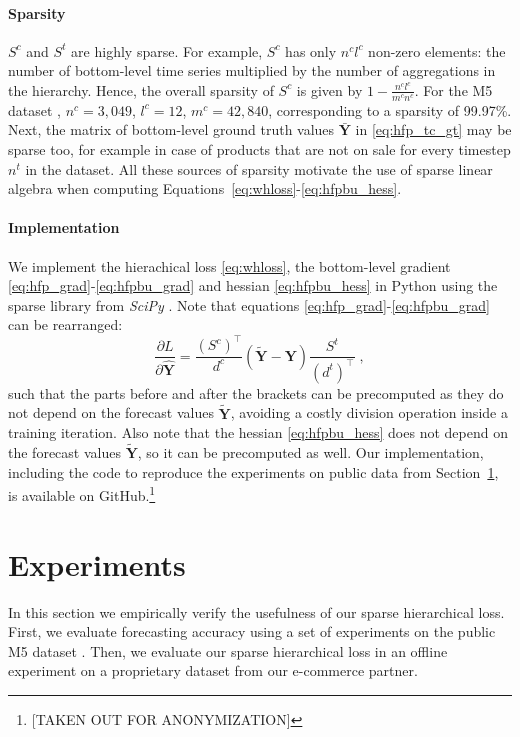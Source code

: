 \documentclass[preprint, 3p, times, twocolumn]{elsarticle}
\begin{document}
\paragraph{Sparsity} \(S^c\) and \(S^t\) are highly sparse. For example, \(S^c\) has only \(n^cl^c\) non-zero elements: the number of bottom-level time series multiplied by the number of aggregations in the hierarchy. Hence, the overall sparsity of \(S^c\) is given by \( 1 - \frac{n^cl^c}{m^cn^c} \). For the M5 dataset \cite{makridakis_m5_2021}, \(n^c = 3,049\), \(l^c = 12\), \(m^c=42,840\), corresponding to a sparsity of 99.97\%. Next, the matrix of bottom-level ground truth values \(\bar{\textbf{Y}}\) in \eqref{eq:hfp_tc_gt} may be sparse too, for example in case of products that are not on sale for every timestep \(n^t\) in the dataset. All these sources of sparsity motivate the use of sparse linear algebra when computing Equations~\eqref{eq:whloss}-\eqref{eq:hfpbu_hess}. 

\paragraph{Implementation} We implement the hierachical loss \eqref{eq:whloss}, the bottom-level gradient \eqref{eq:hfp_grad}-\eqref{eq:hfpbu_grad} and hessian \eqref{eq:hfpbu_hess} in Python using the sparse library from \textit{SciPy} \cite{virtanen_scipy_2020}. Note that equations \eqref{eq:hfp_grad}-\eqref{eq:hfpbu_grad} can be rearranged:
\begin{equation} 
  \frac{\partial L}{\partial \hat{\textbf{Y}}} = \frac{(S^c)^\intercal}{d^c} \left( \tilde{\textbf{Y}} - \textbf{Y} \right) \frac{S^t}{(d^t)^\intercal} \;,
\end{equation}
such that the parts before and after the brackets can be precomputed as they do not depend on the forecast values \(\tilde{\textbf{Y}}\), avoiding a costly division operation inside a training iteration. Also note that the hessian \eqref{eq:hfpbu_hess} does not depend on the forecast values \(\tilde{\textbf{Y}}\), so it can be precomputed as well. Our implementation, including the code to reproduce the experiments on public data from Section~\ref{sec:experiments}, is available on GitHub.\footnote{[TAKEN OUT FOR ANONYMIZATION]}

\section{Experiments}
  \label{sec:experiments}
  In this section we empirically verify the usefulness of our sparse hierarchical loss. First, we evaluate forecasting accuracy using a set of experiments on the public M5 dataset \cite{makridakis_m5_2021}. Then, we evaluate our sparse hierarchical loss in an offline experiment on a proprietary dataset from our e-commerce partner.
\end{document}
